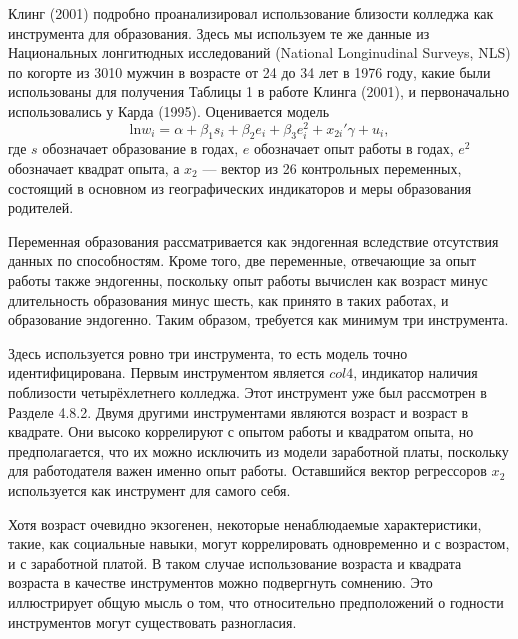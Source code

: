 Клинг (2001) подробно проанализировал использование близости колледжа как инструмента для образования. Здесь мы используем те же данные из Национальных лонгитюдных исследований (National Longinudinal Surveys, NLS) по когорте из 3010 мужчин в возрасте от 24 до 34 лет в 1976 году, какие были использованы для получения Таблицы 1 в работе Клинга (2001), и первоначально использовались у Карда (1995). Оценивается модель
$$
\mathrm{ln} w_i = \alpha + \beta_1 s_i + \beta_2 e_i + \beta_3 e_i^2 + x_{2i}'\gamma+u_i,
$$
где $s$ обозначает образование в годах, $e$ обозначает опыт работы в годах, $e^2$ обозначает квадрат опыта, а $x_2$ --- вектор из 26 контрольных переменных, состоящий в основном из географических индикаторов и меры образования родителей.

Переменная образования рассматривается как эндогенная вследствие отсутствия данных по способностям. Кроме того, две переменные, отвечающие за опыт работы также эндогенны, поскольку опыт работы вычислен как возраст минус длительность образования минус шесть, как принято в таких работах, и образование эндогенно. Таким образом, требуется как минимум три инструмента.

Здесь используется ровно три инструмента, то есть модель точно идентифицирована. Первым инструментом является $col4$, индикатор наличия поблизости четырёхлетнего колледжа. Этот инструмент уже был рассмотрен в Разделе 4.8.2. Двумя другими инструментами являются возраст и возраст в квадрате. Они высоко коррелируют с опытом работы и квадратом опыта, но предполагается, что их можно исключить из модели заработной платы, поскольку для работодателя важен именно опыт работы. Оставшийся вектор регрессоров $x_2$ используется как инструмент для самого себя. 

Хотя возраст очевидно экзогенен, некоторые ненаблюдаемые характеристики, такие, как социальные навыки, могут коррелировать одновременно и с возрастом, и с заработной платой. В таком случае использование возраста и квадрата возраста в качестве инструментов можно подвергнуть сомнению. Это иллюстрирует общую мысль о том, что относительно предположений о годности инструментов могут существовать разногласия.

